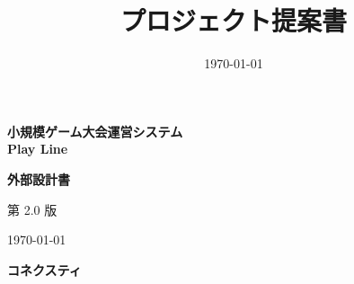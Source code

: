 \documentclass[a4paper]{ltjsarticle}
\title{プロジェクト提案書}
\author{}
\date{\today}
\begin{document}
\begin{titlepage}
    \centering
    \thispagestyle{empty} %

    \vspace*{3cm}

    {\Huge \bfseries 小規模ゲーム大会運営システム \\[0.3em] Play Line \par}

    \vspace{1.5cm}

    {\LARGE \bfseries 外部設計書 \par}

    \vspace{3.5cm}

    {\Large 第 2.0 版 \par}

    \vfill %

    {\large \today \par}

    \vspace{1.2cm}

    {\Large \bfseries コネクスティ \par}

    \vspace{1cm}
\end{titlepage}

\clearpage
{}

\tableofcontents
\clearpage

\end{document}
